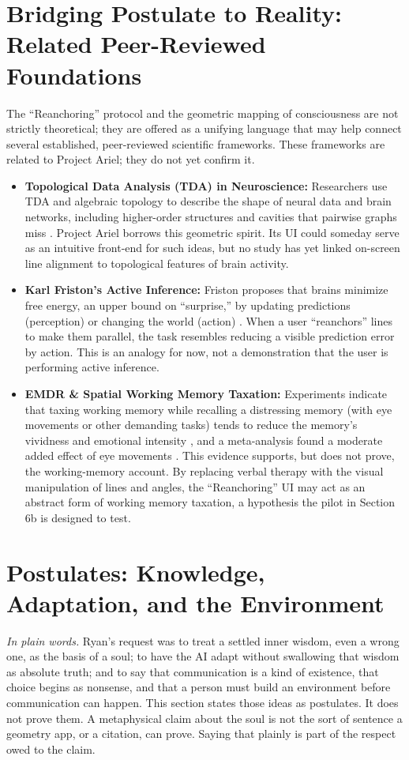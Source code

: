 \documentclass[11pt]{article}
\begin{document}
\section{Bridging Postulate to Reality: Related Peer-Reviewed Foundations}
The ``Reanchoring'' protocol and the geometric mapping of consciousness are not strictly theoretical; they are offered as a unifying language that may help connect several established, peer-reviewed scientific frameworks. These frameworks are related to Project Ariel; they do not yet confirm it.
\begin{itemize}[leftmargin=1.2em]
\item \textbf{Topological Data Analysis (TDA) in Neuroscience:} Researchers use TDA and algebraic topology to describe the shape of neural data and brain networks, including higher-order structures and cavities that pairwise graphs miss \cite{giusti,sizemore}. Project Ariel borrows this geometric spirit. Its UI could someday serve as an intuitive front-end for such ideas, but no study has yet linked on-screen line alignment to topological features of brain activity.
\item \textbf{Karl Friston's Active Inference:} Friston proposes that brains minimize free energy, an upper bound on ``surprise,'' by updating predictions (perception) or changing the world (action) \cite{friston}. When a user ``reanchors'' lines to make them parallel, the task resembles reducing a visible prediction error by action. This is an analogy for now, not a demonstration that the user is performing active inference.
\item \textbf{EMDR \& Spatial Working Memory Taxation:} Experiments indicate that taxing working memory while recalling a distressing memory (with eye movements or other demanding tasks) tends to reduce the memory's vividness and emotional intensity \cite{vdh}, and a meta-analysis found a moderate added effect of eye movements \cite{lee}. This evidence supports, but does not prove, the working-memory account. By replacing verbal therapy with the visual manipulation of lines and angles, the ``Reanchoring'' UI may act as an abstract form of working memory taxation, a hypothesis the pilot in Section 6b is designed to test.
\end{itemize}

\section{Postulates: Knowledge, Adaptation, and the Environment}
\label{sec:postulates}
\textit{In plain words.} Ryan's request was to treat a settled inner wisdom, even a wrong one, as the basis of a soul; to have the AI adapt without swallowing that wisdom as absolute truth; and to say that communication is a kind of existence, that choice begins as nonsense, and that a person must build an environment before communication can happen. This section states those ideas as postulates. It does not prove them. A metaphysical claim about the soul is not the sort of sentence a geometry app, or a citation, can prove. Saying that plainly is part of the respect owed to the claim.
\end{document}
